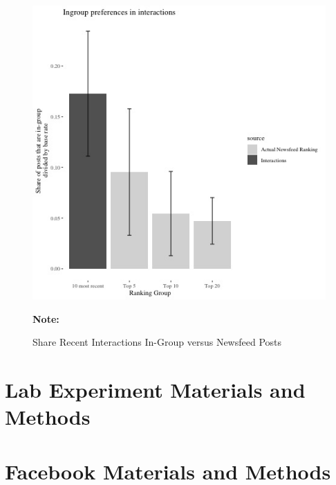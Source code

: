 \documentclass[12pt,letterpaper]{article}
\begin{document}
\begin{figure}[!h]
    \caption{Share Recent Interactions In-Group versus Newsfeed Posts}
    \label{fig:behavior}
    \begin{center}
    \includegraphics[scale=.7, trim={0 0 0cm 2cm}, clip]{Output/Graphs/Audit/Interactions/US preferences reactions and actual rankings above base rate.jpg}
    \end{center}
\footnotesize 
\textbf{Note:} 
\end{figure}

\FloatBarrier
\clearpage
\appendix
\renewcommand\thefigure{\thesection.\arabic{figure}}
\renewcommand\thetable{\thesection.\arabic{table}}


\section{Lab Experiment Materials and Methods}\label{app:labmaterials}

\section{Facebook Materials and Methods}\label{app:materials}
\end{document}
